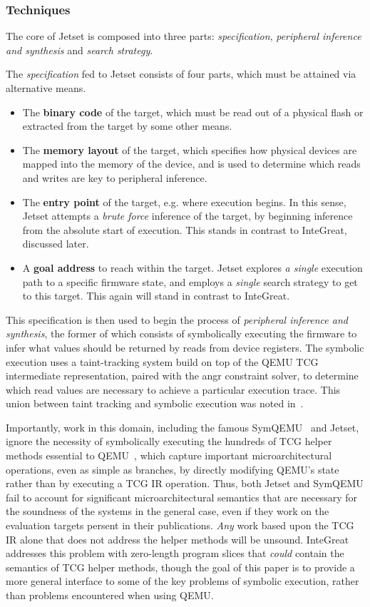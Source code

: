 \subsubsection{Techniques}

The core of Jetset is composed into three parts: \emph{specification}, \emph{peripheral inference and synthesis} and \emph{search strategy}. 

The \emph{specification} fed to Jetset consists of four parts, which must be attained via alternative means.
\begin{itemize}
	\item The \textbf{binary code} of the target, which must be read out of a physical flash or extracted from the target by some other means.
	\item The \textbf{memory layout} of the target, which specifies how physical devices are mapped into the memory of the device, and is used to determine which reads and writes are key to peripheral inference.
	\item The \textbf{entry point} of the target, e.g. where execution begins. In this sense, Jetset attempts a \emph{brute force} inference of the target, by beginning inference from the absolute start of execution. This stands in contrast to InteGreat, discussed later.
	\item A \textbf{goal address} to reach within the target. Jetset explores \emph{a single} execution path to a specific firmware state, and employs a \emph{single} search strategy to get to this target. This again will stand in contrast to InteGreat.
\end{itemize}

This specification is then used to begin the process of \emph{peripheral inference and synthesis}, the former of which consists of symbolically executing the firmware to infer what values should be returned by reads from device registers.
The symbolic execution uses a taint-tracking system build on top of the QEMU TCG intermediate representation, paired with the angr constraint solver, to determine which read values are necessary to achieve a particular execution trace.
This union between taint tracking and symbolic execution was noted in~\cite{schwartz2010all}.

Importantly, work in this domain, including the famous SymQEMU~\cite{poeplau2021symqemu} and Jetset, ignore the necessity of symbolically executing the hundreds of TCG helper methods essential to QEMU~\cite{tcghelper}, which capture important microarchitectural operations, even as simple as branches, by directly modifying QEMU's state rather than by executing a TCG IR operation.
Thus, both Jetset and SymQEMU fail to account for significant microarchitectural semantics that are necessary for the soundness of the systems in the general case, even if they work on the evaluation targets persent in their publications.
\emph{Any} work based upon the TCG IR alone that does not address the helper methods will be unsound.
InteGreat addresses this problem with zero-length program slices that \emph{could} contain the semantics of TCG helper methods, though the goal of this paper is to provide a more general interface to some of the key problems of symbolic execution, rather than problems encountered when using QEMU.

